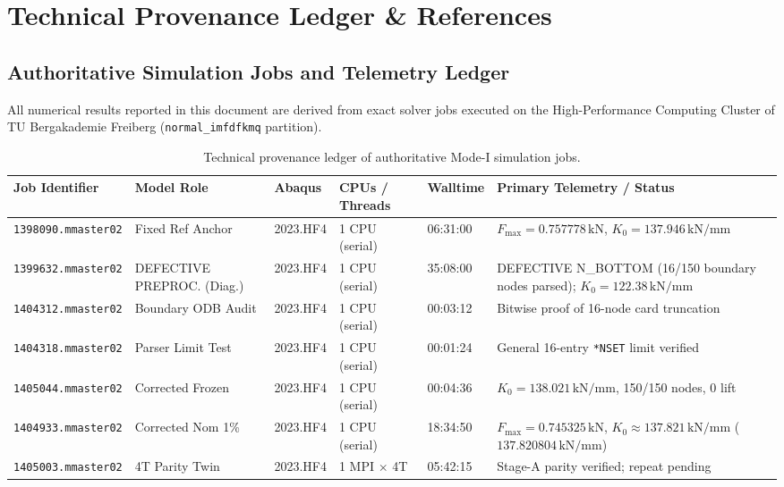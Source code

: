 \section{Technical Provenance Ledger \& References}
\label{sec:provenance_and_references}

\subsection{Authoritative Simulation Jobs and Telemetry Ledger}
All numerical results reported in this document are derived from exact solver jobs executed on the High-Performance Computing Cluster of TU Bergakademie Freiberg (\texttt{normal\_imfdfkmq} partition).

\begin{table}[htbp]
  \centering
  \scriptsize
  \caption{Technical provenance ledger of authoritative Mode-I simulation jobs.}
  \label{tab:provenance_ledger}
  \begin{tabularx}{\textwidth}{L{22mm} L{22mm} C{16mm} C{18mm} C{13mm} L{46mm}}
    \toprule
    \textbf{Job Identifier} & \textbf{Model Role} & \textbf{Abaqus} & \textbf{CPUs / Threads} & \textbf{Walltime} & \textbf{Primary Telemetry / Status} \\
    \midrule
    \texttt{1398090.mmaster02} & Fixed Ref Anchor & 2023.HF4 & 1 CPU (serial) & 06:31:00 & $F_{\max}=0.757778\,\mathrm{kN}$, $K_0=137.946\,\mathrm{kN/mm}$ \\
    \texttt{1399632.mmaster02} & DEFECTIVE PREPROC. (Diag.) & 2023.HF4 & 1 CPU (serial) & 35:08:00 & DEFECTIVE N\_BOTTOM (16/150 boundary nodes parsed); $K_0=122.38\,\mathrm{kN/mm}$ \\
    \texttt{1404312.mmaster02} & Boundary ODB Audit & 2023.HF4 & 1 CPU (serial) & 00:03:12 & Bitwise proof of 16-node card truncation \\
    \texttt{1404318.mmaster02} & Parser Limit Test & 2023.HF4 & 1 CPU (serial) & 00:01:24 & General 16-entry \texttt{*NSET} limit verified \\
    \texttt{1405044.mmaster02} & Corrected Frozen & 2023.HF4 & 1 CPU (serial) & 00:04:36 & $K_0 = 138.021\,\mathrm{kN/mm}$, 150/150 nodes, 0 lift \\
    \texttt{1404933.mmaster02} & Corrected Nom 1\% & 2023.HF4 & 1 CPU (serial) & 18:34:50 & $F_{\max}=0.745325\,\mathrm{kN}$, $K_0 \approx 137.821\,\mathrm{kN/mm}$ ($137.820804\,\mathrm{kN/mm}$) \\
    \texttt{1405003.mmaster02} & 4T Parity Twin & 2023.HF4 & 1 MPI $\times$ 4T & 05:42:15 & Stage-A parity verified; repeat pending \\

\end{tabularx}
\end{table}
